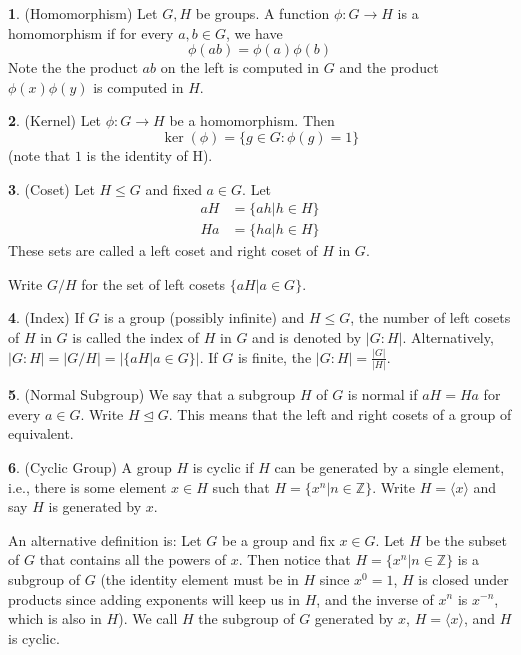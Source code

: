 \documentclass[12pt]{article}
\theoremstyle{definition}
\newtheorem{definition}{\color{NavyBlue}{\textbf{Definition}}}
\begin{document}
\begin{definition}(Homomorphism)
Let $G, H$ be groups. A function $\phi : G \to H$ is a homomorphism if for every $a,b \in G$, we have
\begin{equation}
\phi(ab) = \phi(a)\phi(b)
\end{equation}
Note the the product $ab$ on the left is computed in $G$ and the product $\phi(x)\phi(y)$ is computed in $H$.
\end{definition}

\begin{definition}(Kernel)
Let $\phi:G \to H$ be a homomorphism. Then
\begin{equation}
\ker(\phi) = \{g \in G : \phi(g) = 1 \}
\end{equation}
(note that $1$ is the identity of H).
\end{definition}

\begin{definition}(Coset)
Let $H \leq G$ and fixed $a \in G$. Let
\begin{align*}
aH &= \{ ah | h \in H \} \\
Ha &= \{ ha | h \in H \}
\end{align*}
These sets are called a left coset and right coset of $H$ in $G$.

Write $G/H$ for the set of left cosets $\{aH | a \in G \}$.
\end{definition}

\begin{definition}(Index)
If $G$ is a group (possibly infinite) and $H \leq G$, the number of left cosets of $H$ in $G$ is called the index of $H$ in $G$ and is denoted by $|G : H|$. Alternatively, $|G : H| = | G / H | =  |\{aH | a \in G\} |$. If $G$ is finite, the $|G:H| = \frac{|G|}{|H|}$.
\end{definition}

\begin{definition}(Normal Subgroup)
We say that a subgroup $H$ of $G$ is normal if $aH = Ha$ for every $a \in G$. Write $H \trianglelefteq G$. This means that the left and right cosets of a group of equivalent.
\end{definition}

\begin{definition}(Cyclic Group)
A group $H$ is cyclic if $H$ can be generated by a single element, i.e., there is some element $x \in H$ such that $H = \{x^n | n \in \mathbb{Z} \}$. Write $H  = \langle x \rangle$ and say $H$ is generated by $x$.

An alternative definition is: Let $G$ be a group and fix $x \in G$. Let $H$ be the subset of $G$ that contains all the powers of $x$. Then notice that $H = \{x^n | n \in \mathbb{Z} \}$ is a subgroup of $G$ (the identity element must be in $H$ since $x^0 = 1$, $H$ is closed under products since adding exponents will keep us in $H$, and the inverse of $x^n$ is $x^{-n}$, which is also in $H$). We call $H$ the subgroup of $G$ generated by $x$, $H = \langle x \rangle$, and $H$ is cyclic.
\end{definition}
\end{document}
